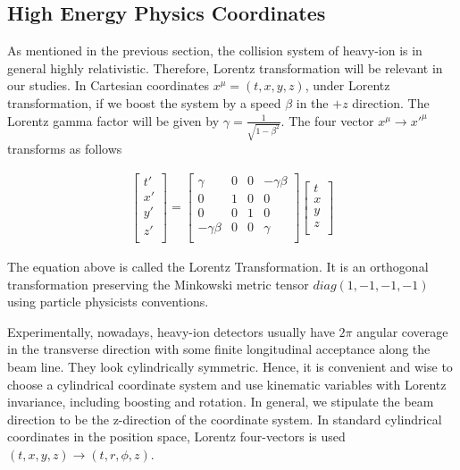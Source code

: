 \subsection{High Energy Physics Coordinates}

As mentioned in the previous section, the collision system of heavy-ion is in general highly relativistic. Therefore, Lorentz transformation will be relevant in our studies. In Cartesian coordinates $x^\mu = (t,x,y,z)$, under Lorentz transformation, if we boost the system by a speed $\beta$ in the $+z$ direction. The Lorentz gamma factor will be given by $\gamma = \frac{1}{\sqrt{1 - \beta^2}}$. The four vector $x^\mu \rightarrow x'^\mu$ transforms as follows

\begin{align}
   \begin{bmatrix} 
           t' \\
           x' \\
           y' \\
           z' \\
         \end{bmatrix} =
             \begin{bmatrix} 
             \gamma  & 0  & 0 & - \gamma \beta \\ 
            0 & 1 & 0 & 0 \\ 
             0 & 0 & 1 & 0 \\
             - \gamma  \beta & 0 & 0 &  \gamma \\
	\end{bmatrix} 
	  \begin{bmatrix} 
           t \\
           x \\
           y \\
           z \\
	\end{bmatrix}
\end{align}

The equation above is called the Lorentz Transformation. It is an orthogonal transformation preserving the Minkowski metric tensor $diag(1,-1,-1,-1)$ using particle physicists conventions.



Experimentally, nowadays, heavy-ion detectors usually have $2\pi$ angular coverage in the transverse direction with some finite longitudinal acceptance along the beam line. They look cylindrically symmetric. Hence, it is convenient and wise to choose a cylindrical coordinate system and use kinematic variables with Lorentz invariance, including boosting and rotation. In general, we stipulate the beam direction to be the z-direction of the coordinate system. In standard cylindrical coordinates in the position space, Lorentz four-vectors is used $(t,x,y,z) \rightarrow (t, r, \phi, z)$. 


